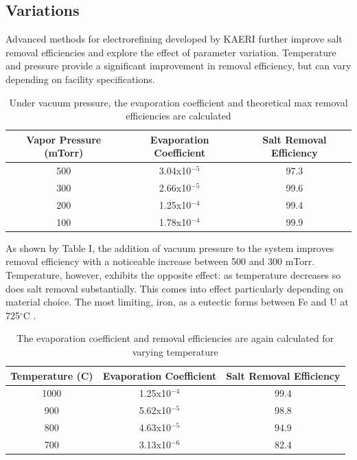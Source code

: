 \documentclass{anstrans}
\begin{document}
\subsection{Variations}

Advanced methods for electrorefining developed by KAERI \cite{lee_advanced_nodate} further improve salt removal efficiencies and explore the effect of parameter variation. Temperature and pressure provide a significant improvement in removal efficiency, but can vary depending on facility specifications. 

\begin{table}[h]
	\centering
	\begin{tabularx}{0.5\textwidth}{ccc}
		\hline
		\textbf{Vapor Pressure (mTorr)} & \textbf{Evaporation Coefficient} & \textbf{Salt Removal Efficiency} \\
		\hline
		500 & 3.04x10$^{-5}$ & 97.3 \\
		300 & 2.66x10$^{-5}$ & 99.6 \\
		200 & 1.25x10$^{-4}$ & 99.4 \\
		100 & 1.78x10$^{-4}$ & 99.9 \\
		\hline
	\end{tabularx}
	\caption {Under vacuum pressure, the evaporation coefficient and theoretical max removal efficiencies are calculated \cite{lee_advanced_nodate}}
	\label {tab:pressure}
\end{table}

As shown by Table I, the addition of vacuum pressure to the system improves removal efficiency with a noticeable increase between 500 and 300 mTorr. Temperature, however, exhibits the opposite effect: as temperature decreases so does salt removal substantially. This comes into effect particularly depending on material choice. The most limiting, iron, as a eutectic forms between Fe and U at 725$^{\circ}$C \cite{chapman_revision_1984}.

\begin{table}[h]
	\centering
	\begin{tabularx}{0.5\textwidth}{ccc}
		\hline
		\textbf{Temperature (C)} & \textbf{Evaporation Coefficient} & \textbf{Salt Removal Efficiency} \\
		\hline
		1000 & 1.25x10$^{-4}$ & 99.4 \\
		900 & 5.62x10$^{-5}$ & 98.8 \\
		800 & 4.63x10$^{-5}$ & 94.9 \\
		700 & 3.13x10$^{-6}$ & 82.4 \\
		\hline
	\end{tabularx}
	\caption {The evaporation coefficient and removal efficiencies are again calculated for varying temperature \cite{lee_advanced_nodate}}
	\label {tab:temperature}
\end{table}
\end{document}
